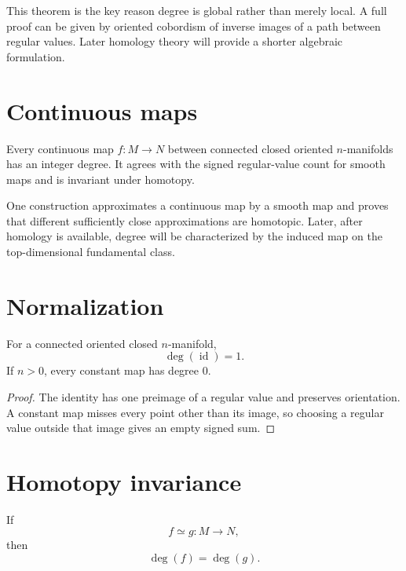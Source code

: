 This theorem is the key reason degree is global rather than merely local.
A full proof can be given by oriented cobordism of inverse images of a path
between regular values.  Later homology theory will provide a shorter algebraic
formulation.

\section{Continuous maps}

\begin{theorem}
\label{thm:viii03-continuous}
Every continuous map \(f:M\to N\) between connected closed oriented
\(n\)-manifolds has an integer degree.  It agrees with the signed regular-value
count for smooth maps and is invariant under homotopy.
\end{theorem}

One construction approximates a continuous map by a smooth map and proves that
different sufficiently close approximations are homotopic.  Later, after
homology is available, degree will be characterized by the induced map on the
top-dimensional fundamental class.

\section{Normalization}

\begin{proposition}
\label{prop:viii03-normalization}
For a connected oriented closed \(n\)-manifold,
\[
\deg(\operatorname{id})=1.
\]
If \(n>0\), every constant map has degree \(0\).
\end{proposition}

\begin{proof}
The identity has one preimage of a regular value and preserves orientation.
A constant map misses every point other than its image, so choosing a regular
value outside that image gives an empty signed sum.
\end{proof}

\section{Homotopy invariance}

\begin{theorem}
\label{thm:viii03-homotopy}
If
\[
f\simeq g:M\to N,
\]
then
\[
\deg(f)=\deg(g).
\]
\end{theorem}

